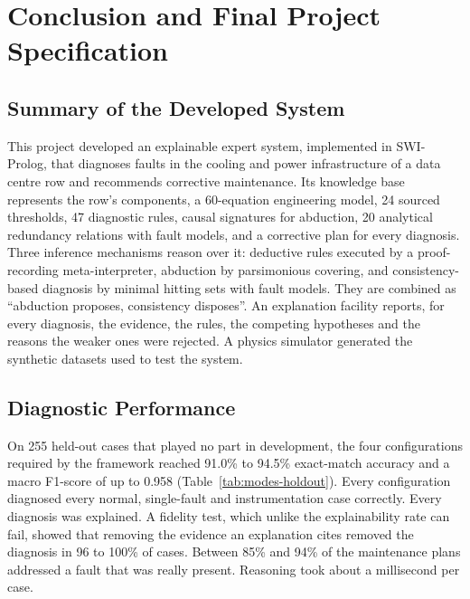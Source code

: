 \chapter{Conclusion and Final Project Specification}
\label{ch:conclusion}

\section{Summary of the Developed System}
\label{sec:summary}

This project developed an explainable expert system, implemented in SWI-Prolog, that diagnoses faults in the cooling and power infrastructure of a data centre row and recommends corrective maintenance. Its knowledge base represents the row's components, a 60-equation engineering model, 24 sourced thresholds, 47 diagnostic rules, causal signatures for abduction, 20 analytical redundancy relations with fault models, and a corrective plan for every diagnosis. Three inference mechanisms reason over it: deductive rules executed by a proof-recording meta-interpreter, abduction by parsimonious covering, and consistency-based diagnosis by minimal hitting sets with fault models. They are combined as ``abduction proposes, consistency disposes''. An explanation facility reports, for every diagnosis, the evidence, the rules, the competing hypotheses and the reasons the weaker ones were rejected. A physics simulator generated the synthetic datasets used to test the system.

\section{Diagnostic Performance}
\label{sec:performance}

On 255 held-out cases that played no part in development, the four configurations required by the framework reached 91.0\% to 94.5\% exact-match accuracy and a macro F1-score of up to 0.958 (Table~\ref{tab:modes-holdout}). Every configuration diagnosed every normal, single-fault and instrumentation case correctly. Every diagnosis was explained. A fidelity test, which unlike the explainability rate can fail, showed that removing the evidence an explanation cites removed the diagnosis in 96 to 100\% of cases. Between 85\% and 94\% of the maintenance plans addressed a fault that was really present. Reasoning took about a millisecond per case.


